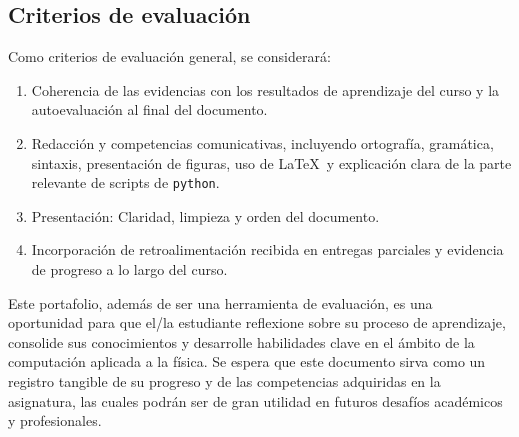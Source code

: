 \documentclass[../portafolio.tex]{subfiles}
\begin{document}
\subsection*{Criterios de evaluación}
Como criterios de evaluación general, se considerará:
\begin{enumerate}
\item Coherencia de las evidencias con los resultados de aprendizaje del curso y la autoevaluación al final del documento.
\item Redacción y competencias comunicativas, incluyendo ortografía,
  gramática, sintaxis, presentación de figuras, uso de
  \LaTeX\ y explicación clara de la parte relevante de scripts de
  \texttt{python}.
\item Presentación: Claridad, limpieza y orden del documento.
\item Incorporación de retroalimentación recibida en entregas
  parciales y evidencia de progreso a lo largo del curso.
\end{enumerate}

\medskip

Este portafolio, además de ser una herramienta de evaluación,
es una oportunidad para que el/la estudiante reflexione
sobre su proceso de aprendizaje, consolide sus conocimientos y
desarrolle habilidades clave en el ámbito de la computación aplicada a
la física. Se espera que este documento sirva como un registro
tangible de su progreso y de las competencias
adquiridas en la asignatura, las cuales podrán ser de gran
utilidad en futuros desafíos académicos y profesionales.
\end{document}
